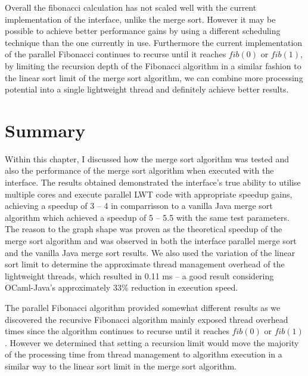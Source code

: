 \documentclass[12pt,twoside,notitlepage]{report}
\begin{document}
%
%

%
%
Overall the fibonacci calculation has not scaled well with the current implementation of the interface, unlike the merge sort. However it may be possible to achieve better performance gains by using a different scheduling technique
than the one currently in use. Furthermore the current implementation of the parallel Fibonacci continues to recurse until it reaches $fib(0)$ or $fib(1)$, by limiting the recursion depth of the Fibonacci algorithm in a similar
fashion to the linear sort limit of the merge sort algorithm, we can combine more processing potential into a single lightweight thread and definitely achieve better results.

\section{Summary}
Within this chapter, I discussed how the merge sort algorithm was tested and also the performance of the merge sort algorithm when executed with the interface. The results obtained demonstrated the interface's true ability to utilise
multiple cores and execute parallel LWT code with appropriate speedup gains, achieving a speedup of 3 -- 4 in comparrisson to a vanilla Java merge sort algorithm which achieved a speedup of 5 -- 5.5 with the same test parameters. The
reason to the graph shape was proven as the theoretical speedup of the merge sort algorithm and was observed in both the interface parallel merge sort and the vanilla Java merge sort results. We also used the variation of the linear
sort limit to determine the approximate thread management overhead of the lightweight threads, which resulted in 0.11 ms -- a good result considering OCaml-Java's approximately 33\% reduction in execution speed.

The parallel Fibonacci algorithm provided somewhat different results as we discovered the recursive Fibonacci algorithm mainly exposed thread overhead times since the algorithm continues to recurse until it reaches $fib(0)$ or
$fib(1)$. However we determined that setting a recursion limit would move the majority of the processing time from thread management to algorithm execution in a similar way to the linear sort limit in the merge sort algorithm.
\end{document}
